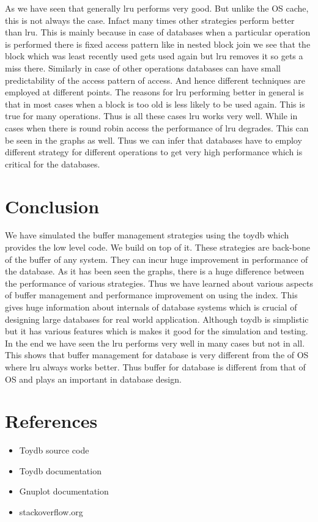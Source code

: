As we have seen that generally lru performs very good. But unlike the OS cache, this is not always the case. Infact many times other strategies perform better than lru. This is mainly because in case of databases when a particular operation is performed there is fixed access pattern like in nested block join we see that the block which was least recently used gets used again but lru removes it so gets a miss there. Similarly in case of other operations databases can have small predictability of the access pattern of access. And hence different techniques are employed at different points. The reasons for lru performing better in general is that in most cases when a block is too old is less likely to be used again. This is true for many operations. Thus is all these cases lru works very well. While in cases when there is round robin access the performance of lru degrades. This can be seen in the graphs as well. Thus we can infer that databases have to employ different strategy for different operations to get very high performance which is critical for the databases.


\section*{{Conclusion}}

We have simulated the buffer management strategies using the toydb which provides the low level code. We build on top of it. These strategies are back-bone of the buffer of any system. They can incur huge improvement in performance of the database. As it has been seen the graphs, there is a huge difference between the performance of various strategies. Thus we have learned about various aspects of buffer management and performance improvement on using the index. This gives huge information about internals of database systems which is crucial of designing large databases for real world application. Although toydb is simplistic but it has various features which is makes it good for the simulation and testing. In the end we have seen the lru performs very well in many cases but not in all. This shows that  buffer management for database is very different from the of OS where lru always works better. Thus buffer for database is different from that of OS and plays an important in database design.

\section*{{References}}
\begin{itemize}
\item Toydb source code
\item Toydb documentation
\item Gnuplot documentation
\item stackoverflow.org
\end{itemize}


